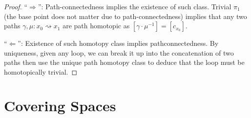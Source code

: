 \documentclass{article}
\theoremstyle{definition}
\theoremstyle{remark}
\theoremstyle{plain}
\begin{document}
\begin{proof}
    ``$\Rightarrow$'': Path-connectedness implies the existence of such class. Trivial $\pi_1$ (the base point does not matter due to path-connectedness) implies that any two paths $\gamma,\mu:x_0\rightsquigarrow x_1$ are path homotopic as $[\gamma\cdot\mu^{-1}]=[c_{x_0}]$.

    ``$\Leftarrow$'': Existence of such homotopy class implies pathconnectedness. By uniqueness, given any loop, we can break it up into the concatenation of two paths then use the unique path homotopy class to deduce that the loop must be homotopically trivial.
\end{proof}

\section{Covering Spaces}
\end{document}
